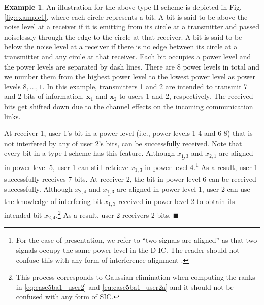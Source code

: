 \documentclass[12pt, draftclsnofoot, onecolumn]{IEEEtran}
\theoremstyle{definition}
\newtheorem{example}{Example}
\begin{document}
\begin{example}
An illustration for the above type II scheme is depicted in Fig. \ref{fig:example1}, where each circle represents a bit. A bit is said to be above the noise level at a receiver if it is emitting from its circle at a transmitter and passed noiselessly through the edge to the circle at that receiver. A bit is said to be below the noise level at a receiver if there is no edge between its circle at a transmitter and any circle at that receiver. Each bit occupies a power level and the power levels are separated by dash lines. There are 8 power levels in total and we number them from the highest power level to the lowest power level as power levels $8,\ldots,1$. In this example, transmitters 1 and 2 are intended to transmit 7 and 2 bits of information, $\boldsymbol{x}_1$ and $\boldsymbol{x}_2$ to users 1 and 2, respectively. The received bits get shifted down due to the channel effects on the incoming communication links.




At receiver 1, user 1's bit in a power level (i.e., power levels 1-4 and 6-8) that is not interfered by any of user 2's bits, can be successfully received. Note that every bit in a type I scheme has this feature. Although $\underline{x_{1,3}}$ and $x_{2,1}$ are aligned in power level 5, user 1 can still retrieve $\underline{x_{1,3}}$ in power level 4.\footnote{For the ease of presentation, we refer to ``two signals are aligned'' as that two signals occupy the same power level in the D-IC. The reader should not confuse this with any form of interference alignment \cite{4567443,6846359}.} As a result, user 1 successfully receives 7 bits. At receiver 2, the bit in power level 6 can be received successfully. Although $x_{2,4}$ and $\underline{x_{1,3}}$ are aligned in power level 1, user 2 can use the knowledge of interfering bit $\underline{x_{1,3}}$ received in power level 2 to obtain its intended bit $x_{2,4}$.\footnote{This process corresponds to Gaussian elimination when computing the ranks in \eqref{eq:case5ba1_user2} and \eqref{eq:case5ba1_user2a} and it should not be confused with any form of SIC.} As a result, user 2 receivers 2 bits. \hspace{104mm}$\blacksquare$
\end{example}
\end{document}
